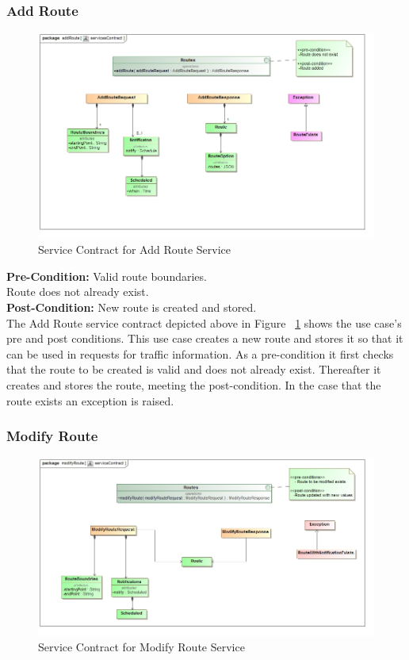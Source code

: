 \documentclass[a4paper,12pt]{article}
\begin{document}
\subsubsection{Add Route}
\begin{figure}[ht]
\includegraphics[width=\textwidth]{images/scAdd_Route.jpg}
\caption{Service Contract for Add Route Service}
\label{fig:sc_addroute}
\end{figure}

\textbf{Pre-Condition: }
Valid route boundaries.\\
Route does not already exist.\\
\textbf{Post-Condition: }
New route is created and stored.\\

The Add Route service contract depicted above in Figure ~\ref{fig:sc_addroute} shows the use case's pre and post conditions. This use case creates a new route and stores it so that it can be used in requests for traffic information. As a pre-condition it first checks that the route to be created is valid and does not already exist. Thereafter it creates and stores the route, meeting the post-condition. In the case that the route exists an exception is raised.
\subsubsection{Modify Route} 
\begin{figure}[ht]
\includegraphics[width=\textwidth]{images/scModify_Route.jpg}
\caption{Service Contract for Modify Route Service}
\label{fig:sc_modifyroute}
\end{figure}
\end{document}

